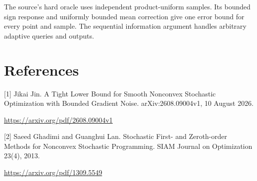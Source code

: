 \documentclass[10pt,a4paper]{article}
\begin{document}
The source's hard oracle uses independent product-uniform samples. Its bounded sign response and uniformly bounded mean correction give one error bound for every point and sample. The sequential information argument handles arbitrary adaptive queries and outputs.

\section{References}
[1] Jikai Jin. A Tight Lower Bound for Smooth Nonconvex Stochastic Optimization with Bounded Gradient Noise. arXiv:2608.09004v1, 10 August 2026.

\url{https://arxiv.org/pdf/2608.09004v1}

[2] Saeed Ghadimi and Guanghui Lan. Stochastic First- and Zeroth-order Methods for Nonconvex Stochastic Programming. SIAM Journal on Optimization 23(4), 2013.

\url{https://arxiv.org/pdf/1309.5549}
\end{document}
